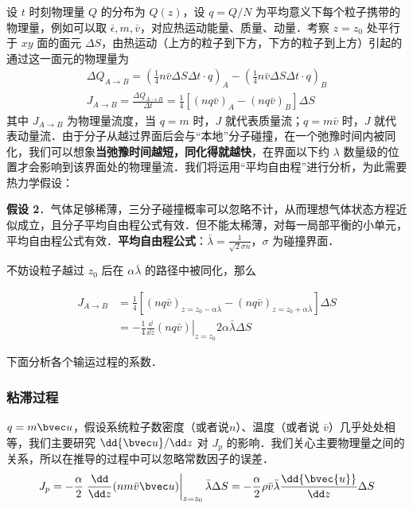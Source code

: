 设 $t$ 时刻物理量 $Q$ 的分布为 $Q(z)$，设 $q=Q/N$ 为平均意义下每个粒子携带的物理量，例如可以取 $\bar \epsilon,m,\bar v$，对应热运动能量、质量、动量．考察 $z=z_0$ 处平行于 $xy$ 面的面元 $\Delta S$，由热运动（上方的粒子到下方，下方的粒子到上方）引起的通过这一面元的物理量为
\begin{align}
\Delta Q_{A\rightarrow B}=(\frac{1}{4}n\bar v \Delta S\Delta t\cdot q)_A-(\frac{1}{4}n\bar v \Delta S\Delta t\cdot q)_B
\\
J_{A\rightarrow B}=\frac{\Delta Q_{A\rightarrow B}}{\Delta t}=\frac{1}{4}[(nq\bar v)_A-(nq\bar v)_B]\Delta S
\end{align}
其中 $J_{A\rightarrow B}$ 为物理量流度，当 $q=m$ 时，$J$ 就代表质量流；$q=m\bar v$ 时，$J$ 就代表动量流．由于分子从越过界面后会与“本地”分子碰撞，在一个弛豫时间内被同化，我们可以想象\textbf{当弛豫时间越短，同化得就越快}，在界面以下约 $\lambda$ 数量级的位置才会影响到该界面处的物理量流．我们将运用“平均自由程”进行分析，为此需要热力学假设：

\textbf{假设 2}．气体足够稀薄，三分子碰撞概率可以忽略不计，从而理想气体状态方程近似成立，且分子平均自由程公式有效．但不能太稀薄，对每一局部平衡的小单元，平均自由程公式有效．\textbf{平均自由程公式}：$\bar \lambda = \frac{1}{\sqrt{2} \sigma n}$，$\sigma$ 为碰撞界面．

不妨设粒子越过 $z_0$ 后在 $\alpha \bar \lambda$ 的路径中被同化，那么

\begin{align}
J_{A\rightarrow B} &=\frac{1}{4}[(nq\bar v)_{z=z_0-\alpha \bar \lambda}-(nq\bar v)_{z=z_0+\alpha \bar \lambda}]\Delta S\\
&=-\frac{1}{4}\left.\frac{\dd}{\dd z}(nq\bar v)\right|_{z=z_0} 2\alpha\bar \lambda \Delta S
\end{align}

下面分析各个输运过程的系数．

\subsubsection{粘滞过程}
$q=m\bvec u$，假设系统粒子数密度（或者说$n$）、温度（或者说 $\bar v$）几乎处处相等，我们主要研究 $\dd{\bvec u}/\dd z$ 对 $J_p$ 的影响．我们关心主要物理量之间的关系，所以在推导的过程中可以忽略常数因子的误差．
\begin{equation}
J_p=-\frac{\alpha}{2}\left.\frac{\dd}{\dd z}(nm\bar v \bvec u)\right|_{z=z_0}\bar \lambda \Delta S
=-\frac{\alpha}{2}\rho\bar v \bar \lambda \frac{\dd{\bvec{u}}}{\dd z}\Delta S
\end{equation}

